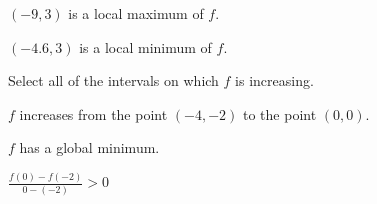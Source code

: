 \documentclass{ximera}
\begin{document}
\begin{exercise}
\begin{question}
$(-9, 3)$ is a local maximum of $f$. \\


\begin{multipleChoice}
\end{multipleChoice}




$(-4.6, 3)$ is a local minimum of $f$. \\


\begin{multipleChoice}
\end{multipleChoice}

\end{question}






\begin{question} 

Select all of the intervals on which $f$ is increasing.
\begin{selectAll}
\choice {$[-9, -5]$}
\choice [correct]{$[-6, -5]$}
\choice [correct]{$[-6, 0]$}
\choice {$[-2, 2]$}
\choice [correct]{$[-2, 2)$}
\choice {$[0, 5]$}
\choice [correct]{$[6, 8]$}
\choice {$[-9, 8]$}
\end{selectAll}


\end{question}





\begin{question} 

$f$ increases from the point $(-4, -2)$ to the point $(0,0)$.
\begin{multipleChoice}
\end{multipleChoice}

\end{question}




\begin{question} 

$f$ has a global minimum.
\begin{multipleChoice}
\end{multipleChoice}


\end{question}







\begin{question} 

$\frac{f(0) - f(-2)}{0-(-2)} > 0$
\begin{multipleChoice}
\end{multipleChoice}


\end{question}







\end{exercise}
\end{document}
